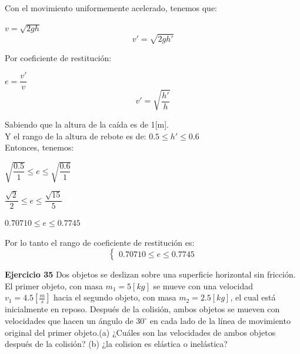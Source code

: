 \documentclass[a4paper,11pt]{scrartcl}
\begin{document}
\begin{center}

Con el movimiento uniformemente acelerado, tenemos que: \\
\begin{center}
$v =   \sqrt{2gh}  $ \\
\begin{equation}
v' =    \sqrt{2gh'}
\end{equation}
\end{center}

Por coeficiente de restitución: \\
\begin{center}
$e =  \dfrac{v'}{v}     $ \\
\begin{equation}
v' =    \sqrt{\dfrac{h'}{h}}
\end{equation}
\end{center}

Sabiendo que la altura de la caída es de 1[m].\\
Y el rango de la altura de rebote es de: $ 0.5 \leq h' \leq 0.6$\\

Entonces, tenemos: \\
\begin{center}
$  \sqrt{\dfrac{0.5}{1}} \leq e \leq  \sqrt{\dfrac{0.6}{1}}$\\
\end{center}
\begin{center}
$\dfrac{ \sqrt{2}}{2} \leq e \leq \dfrac{ \sqrt{15}}{5}$\\
\end{center}
\begin{center}
$0.70710 \leq e \leq 0.7745$\\
\end{center}

Por lo tanto el rango de coeficiente de restitución es:
\begin{equation*}
  \left\lbrace
  \begin{array}{l}
    0.70710 \leq e \leq 0.7745
  \end{array}
  \right.
\end{equation*}


\end{center}

\textbf{Ejercicio 35} Dos objetos se deslizan sobre una superficie horizontal sin fricción. El primer objeto, con
masa $m_1 = 5 [kg]$ se mueve con una velocidad $v_1 = 4.5 [\frac{m}{s}]$ hacia el segundo objeto, con masa $m_2 =  2.5 [kg]$, el  cual  está  inicialmente  en reposo.  Después  de  la  colisión, ambos
objetos se mueven con velocidades que hacen un ángulo de $30^{\circ}$ en cada lado de la línea de movimiento original del primer objeto.(a) ¿Cuáles son las velocidades de ambos objetos después de la colisión? (b) ¿la colision es elástica o inelástica?\\
\end{document}
